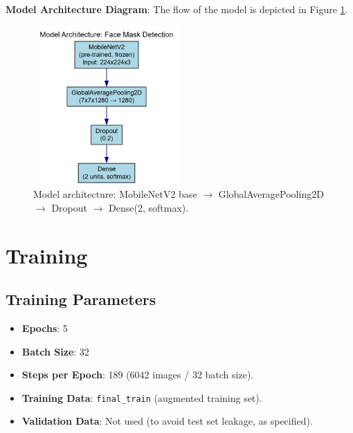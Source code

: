 \documentclass[a4paper,12pt]{article}
\begin{document}
\textbf{Model Architecture Diagram}: The flow of the model is depicted in Figure \ref{fig:model_architecture}.
\begin{figure}[h]
    \centering
    \includegraphics[width=0.5\textwidth]{model_architecture}
    \caption{Model architecture: MobileNetV2 base $\rightarrow$ GlobalAveragePooling2D $\rightarrow$ Dropout $\rightarrow$ Dense(2, softmax).}
    \label{fig:model_architecture}
\end{figure}

\section{Training}
\subsection{Training Parameters}
\begin{itemize}
    \item \textbf{Epochs}: 5
    \item \textbf{Batch Size}: 32
    \item \textbf{Steps per Epoch}: 189 (6042 images / 32 batch size).
    \item \textbf{Training Data}: \texttt{final\_train} (augmented training set).
    \item \textbf{Validation Data}: Not used (to avoid test set leakage, as specified).
\end{itemize}
\end{document}
